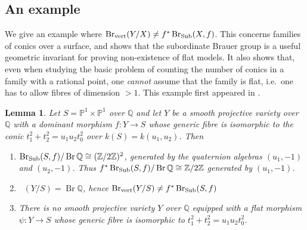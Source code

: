\documentclass[a4paper,12pt,reqno]{amsart}
\numberwithin{equation}{section} \numberwithin{figure}{section}
\DeclareMathOperator{\Br}{Br} \DeclareMathOperator{\Brnr}{Br_{nr}}
\DeclareMathOperator{\BrV}{Br_{vert}}
\renewcommand\P{\mathbb{P}}
\newcommand\Z{\mathbb{Z}}
\newcommand\Q{\mathbb{Q}}
\renewcommand{\#}{\sharp}
\newtheorem{lemma}{Lemma}
\theoremstyle{definition}
\numberwithin{lemma}{section}
\begin{document}
\subsection{An example}

We give an example where $\BrV(Y/X) \neq f^*\Sub(X,f)$. This concerns families of conics over a surface, and shows that the subordinate Brauer group is a useful geometric invariant for proving non-existence of flat models. It also shows that, even when studying the basic problem of counting the number of conics in a family with a rational point, one \textit{cannot} assume that the family is flat, i.e.~one has to allow fibres of dimension $>1$. This example first appeared in \cite[Ex.~2.9]{Lou18}.

\begin{lemma} \label{lem:counter-example}
	Let $S = \P^1 \times \P^1$ over $\Q$ and let $Y$ be a smooth projective variety
	over $\Q$ with a dominant morphism  $f:Y \to S$  whose generic fibre is isomorphic
	to the conic $t_1^2 + t_2^2 = u_1u_2t_0^2$ over $k(S) = k(u_1,u_2)$. Then
	\begin{enumerate}
		\item $\Sub(S,f)/ \Br \Q \cong (\Z/2\Z)^2$, generated by the quaternion algebras
		$(u_1,-1)$ and $(u_2,-1)$. Thus $f^*\Sub(S,f) / \Br \Q \cong \Z/2\Z$ generated by $(u_1,-1)$.
		\item $\BrV(Y/S) = \Br \Q$, hence $\BrV(Y/S) \neq f^*\Sub(S,f)$
		\item There is no smooth projective variety $Y$ over $\Q$ equipped with a flat morphism
		$\psi: Y \to S$ whose generic fibre is isomorphic to $t_1^2 + t_2^2 = u_1u_2t_0^2$.
	\end{enumerate}
\end{lemma}
\end{document}
